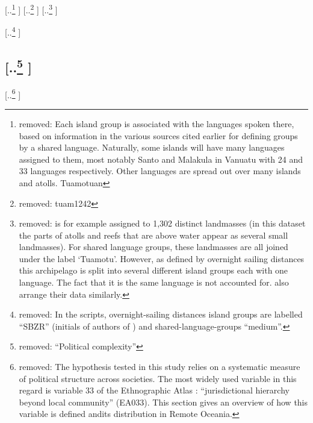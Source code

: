 \documentclass[unnumsec,webpdf,modern,medium]{oup-authoring-template}
\providecommand{\DIFdeltex}[1]{{\protect\color{red} [..\footnote{removed: #1} ]}} %
\providecommand{\DIFdel}[1]{\texorpdfstring{\DIFdeltex{#1}}{}} %
\begin{document}

\DIFdel{Each island group is associated with the languages spoken there, based on information in the various sources cited earlier for defining groups by a shared language. Naturally, some islands will have many languages assigned to them, most notably Santo and Malakula in Vanuatu with 24 and 33 languages respectively. Other languages are spread out over many islands and atolls. Tuamotuan }%
\DIFdel{tuam1242}%
\DIFdel{is for example assigned to 1,302 distinct landmasses (in this dataset the parts of atolls and reefs that are above water appear as several small landmasses). For shared language groups, these landmasses are all joined under the label `Tuamotu'. However, as defined by overnight sailing distances this archipelago is split into several different island groups each with one language. The fact that it is the same language is not accounted for. \citet{gavin2012island} also arrange their data similarly.
}%

\DIFdel{In the scripts, overnight-sailing distances island groups are labelled ``SBZR'' (initials of authors of \cite{NZSA_overnight_2023}) and shared-language-groups ``medium''.
}%

\subsection{\DIFdel{``Political complexity''}}
\addtocounter{subsection}{-1}%
\DIFdel{The hypothesis tested in this study relies on a systematic measure of political structure across societies. The most widely used variable in this regard is variable 33 of the Ethnographic Atlas \citep{EA_1971}: ``jurisdictional hierarchy beyond local community'' (EA033). This section gives an overview of how this variable is defined andits distribution in Remote Oceania. 
}%
\end{document}
